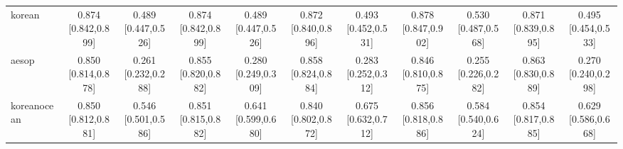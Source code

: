 \documentclass[10pt]{article}
\begin{document}
\begin{landscape}
\begin{longtable}{@{}l*{10}{c}@{}}
korean & \shortstack{0.874\\{}[0.842,0.899]} & \shortstack{0.489\\{}[0.447,0.526]} & \shortstack{0.874\\{}[0.842,0.899]} & \shortstack{0.489\\{}[0.447,0.526]} & \shortstack{0.872\\{}[0.840,0.896]} & \shortstack{0.493\\{}[0.452,0.531]} & \shortstack{0.878\\{}[0.847,0.902]} & \shortstack{0.530\\{}[0.487,0.568]} & \shortstack{0.871\\{}[0.839,0.895]} & \shortstack{0.495\\{}[0.454,0.533]}\\
aesop & \shortstack{0.850\\{}[0.814,0.878]} & \shortstack{0.261\\{}[0.232,0.288]} & \shortstack{0.855\\{}[0.820,0.882]} & \shortstack{0.280\\{}[0.249,0.309]} & \shortstack{0.858\\{}[0.824,0.884]} & \shortstack{0.283\\{}[0.252,0.312]} & \shortstack{0.846\\{}[0.810,0.875]} & \shortstack{0.255\\{}[0.226,0.282]} & \shortstack{0.863\\{}[0.830,0.889]} & \shortstack{0.270\\{}[0.240,0.298]}\\
koreanocean & \shortstack{0.850\\{}[0.812,0.881]} & \shortstack{0.546\\{}[0.501,0.586]} & \shortstack{0.851\\{}[0.815,0.882]} & \shortstack{0.641\\{}[0.599,0.680]} & \shortstack{0.840\\{}[0.802,0.872]} & \shortstack{0.675\\{}[0.632,0.712]} & \shortstack{0.856\\{}[0.818,0.886]} & \shortstack{0.584\\{}[0.540,0.624]} & \shortstack{0.854\\{}[0.817,0.885]} & \shortstack{0.629\\{}[0.586,0.668]}\\

\end{longtable}
\end{landscape}
\end{document}
